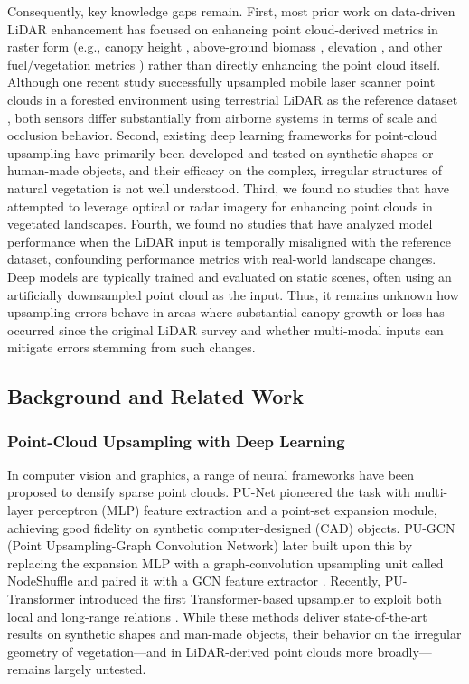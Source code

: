 \documentclass[remotesensing,article,accept,pdftex,moreauthors]{Definitions/mdpi}
\begin{document}
Consequently, key knowledge gaps remain. First, most prior work on data-driven LiDAR enhancement has focused on enhancing point cloud-derived metrics in raster form (e.g., canopy height \cite{wilkes_mapping_2015, wagner_sub-meter_2024}, above-ground biomass \cite{shendryk2022fusing}, elevation \cite{li2023large}, and other fuel/vegetation metrics \cite{taneja2023up, gazzea2023high}) rather than directly enhancing the point cloud itself. Although one recent study successfully upsampled mobile laser scanner point clouds in a forested environment using terrestrial LiDAR as the reference dataset \cite{remijnse2024upsampling}, both sensors differ substantially from airborne systems in terms of scale and occlusion behavior. Second, existing deep learning frameworks for point-cloud upsampling have primarily been developed and tested on synthetic shapes or human-made objects, and their efficacy on the complex, irregular structures of natural vegetation is not well understood. Third, we found no studies that have attempted to leverage optical or radar imagery for enhancing point clouds in vegetated landscapes. Fourth, we found no studies that have analyzed model performance when the LiDAR input is temporally misaligned with the reference dataset, confounding performance metrics with real-world landscape changes. Deep models are typically trained and evaluated on static scenes, often using an artificially downsampled point cloud as the input. Thus, it remains unknown how upsampling errors behave in areas where substantial canopy growth or loss has occurred since the original LiDAR survey and whether multi-modal inputs can mitigate errors stemming from such changes.

\subsection{Background and Related Work}

\subsubsection{Point-Cloud Upsampling with Deep Learning}

In computer vision and graphics, a range of neural frameworks have been proposed to densify sparse point clouds. PU-Net \cite{yu2018pu} pioneered the task with multi-layer perceptron (MLP) feature extraction and a point-set expansion module, achieving good fidelity on synthetic computer-designed (CAD) objects. PU-GCN (Point Upsampling-Graph Convolution Network) later built upon this by replacing the expansion MLP with a graph-convolution upsampling unit called NodeShuffle
and paired it with a GCN feature extractor \cite{qian2021pu}. Recently, PU-Transformer introduced the first Transformer-based upsampler to exploit both local and long-range relations \cite{qiu2022pu}. While these methods deliver state-of-the-art results on synthetic shapes and man-made objects, their behavior on the irregular geometry of vegetation—and in LiDAR-derived point clouds more broadly—remains largely untested.
\end{document}
